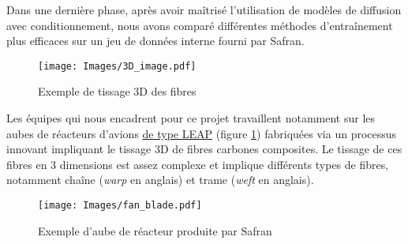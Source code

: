 \documentclass{article}
\begin{document}
\noindent \begin{minipage}{0.73\textwidth}
\setlength{\parindent}{1.5em}
Dans une dernière phase, après avoir maîtrisé l'utilisation de modèles de diffusion avec conditionnement, nous avons comparé différentes méthodes d'entraînement plus efficaces sur un jeu de données interne fourni par Safran.

\begin{minipage}{0.3\textwidth}
    \begin{figure}[H]
        \centering
        \texttt{[image: Images/3D\_image.pdf]}
        \caption{Exemple de tissage 3D des fibres}
    \end{figure}
\end{minipage}
\begin{minipage}{0.02\textwidth}
\hfill
\end{minipage}
\begin{minipage}{0.68\textwidth}
 Les équipes qui nous encadrent pour ce projet travaillent notamment sur les aubes de réacteurs d'avions \href{https://fr.wikipedia.org/wiki/CFM_International_LEAP}{de type LEAP} (figure \ref{fan_blade}) fabriquées via un processus innovant impliquant le tissage 3D de fibres carbones composites. Le tissage de ces fibres en 3 dimensions est assez complexe et implique différents types de fibres, notamment chaîne (\textit{warp} en anglais) et trame (\textit{weft} en anglais).
\end{minipage}

\end{minipage}
\begin{minipage}{0.02\textwidth}
\end{minipage}
\begin{minipage}{0.3\textwidth}
\vspace{-0.5cm}
\begin{figure}[H]
    \centering
    \texttt{[image: Images/fan\_blade.pdf]}
    \caption{Exemple d'aube de réacteur produite par Safran}
    \label{fan_blade}
\end{figure}
\end{minipage}

\vspace{0.3cm}
\end{document}
